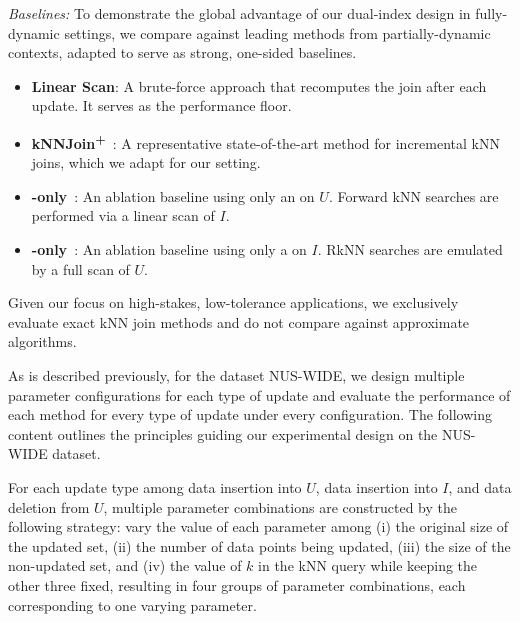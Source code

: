\noindent\textit{Baselines:} To demonstrate the global advantage of our dual-index design in fully-dynamic settings, we compare against leading methods from partially-dynamic contexts, adapted to serve as strong, one-sided baselines.
\begin{itemize}[leftmargin=1.5em]
    \item \textbf{Linear Scan}: A brute-force approach that recomputes the join after each update. It serves as the performance floor.
    \item \textbf{kNNJoin\textsuperscript{+}}~\cite{sphere_tree_yu2009}: A representative state-of-the-art method for incremental kNN joins, which we adapt for our setting.
    \item \textbf{\hdrtree-only}~\cite{yang2014continuous}: An ablation baseline using only an \hdrtree on $U$. Forward kNN searches are performed via a linear scan of $I$.
    \item \textbf{\deltatree-only}~\cite{cui2003contorting}: An ablation baseline using only a \deltatree on $I$. RkNN searches are emulated by a full scan of $U$.
\end{itemize}
Given our focus on high-stakes, low-tolerance applications, we exclusively evaluate exact kNN join methods and do not compare against approximate algorithms.


As is described previously, for the dataset NUS-WIDE, we design multiple parameter configurations for each type of update and evaluate the performance of each method for every type of update under every configuration. The following content outlines the principles guiding our experimental design on the NUS-WIDE dataset.


For each update type among data insertion into $U$, data insertion into $I$, and data deletion from $U$, multiple parameter combinations are constructed by the following strategy: vary the value of each parameter among (i) the original size of the updated set, (ii) the number of data points being updated, (iii) the size of the non-updated set, and (iv) the value of $k$ in the kNN query while keeping the other three fixed, resulting in four groups of parameter combinations, each corresponding to one varying parameter.

